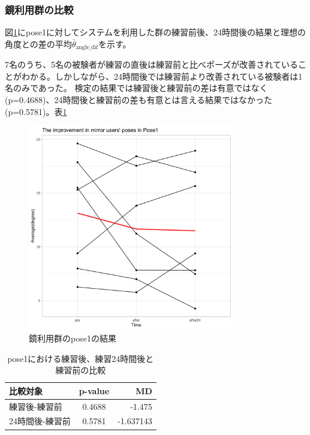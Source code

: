     \subsubsection{鏡利用群の比較}
      図\ref{fig:pose1_mirror}にpose1に対してシステムを利用した群の練習前後、24時間後の結果と理想の角度との差の平均\(\bar{\theta}_{\text{angle\_dif}}\)を示す。


      7名のうち、5名の被験者が練習の直後は練習前と比べポーズが改善されていることがわかる。しかしながら、24時間後では練習前より改善されている被験者は1名のみであった。
      検定の結果では練習後と練習前の差は有意ではなく(p=0.4688)、24時間後と練習前の差も有意とは言える結果ではなかった(p=0.5781)。表\ref{table:pose1_mirror_p_value}

      \begin{figure}[H]
        \begin{center}
        \includegraphics[width=9cm]{figures/pose1_system_false_graph.png}
        \caption{鏡利用群のpose1の結果}
        \label{fig:pose1_mirror}
        \end{center}
      \end{figure}

      \begin{table}[ht]
        \centering
        \caption{pose1における練習後、練習24時間後と練習前の比較}
        \begin{tabular}{lcr}
        \hline
        \textbf{比較対象} & \textbf{p-value} & \textbf{MD} \\ \hline
        練習後-練習前 & 0.4688 & -1.475 \\ \hline
        24時間後-練習前 & 0.5781 & -1.637143 \\ \hline
        \end{tabular}
        \label{table:pose1_mirror_p_value}
        \end{table}

